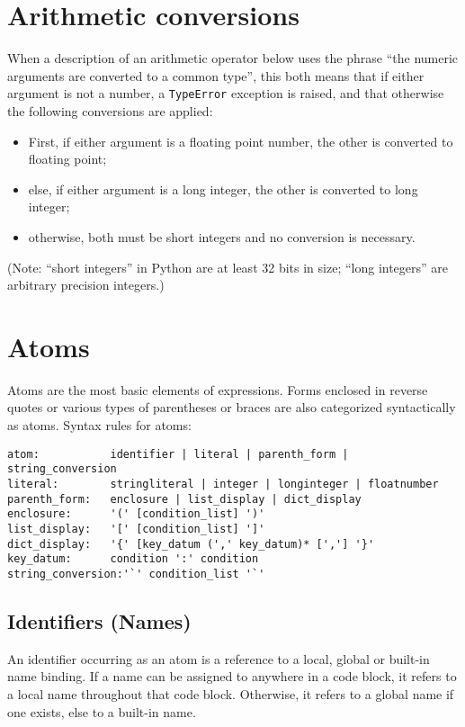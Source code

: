 \section{Arithmetic conversions}

When a description of an arithmetic operator below uses the phrase
``the numeric arguments are converted to a common type'',
this both means that if either argument is not a number, a
{\tt TypeError} exception is raised, and that otherwise
the following conversions are applied:

\begin{itemize}
\item	First, if either argument is a floating point number,
	the other is converted to floating point;
\item	else, if either argument is a long integer,
	the other is converted to long integer;
\item	otherwise, both must be short integers and no conversion
	is necessary.
\end{itemize}

(Note: ``short integers'' in Python are at least 32 bits in size;
``long integers'' are arbitrary precision integers.)

\section{Atoms}

Atoms are the most basic elements of expressions.
Forms enclosed in reverse quotes or various types of parentheses
or braces are also categorized syntactically as atoms.
Syntax rules for atoms:

\begin{verbatim}
atom:           identifier | literal | parenth_form | string_conversion
literal:        stringliteral | integer | longinteger | floatnumber
parenth_form:   enclosure | list_display | dict_display
enclosure:      '(' [condition_list] ')'
list_display:   '[' [condition_list] ']'
dict_display:   '{' [key_datum (',' key_datum)* [','] '}'
key_datum:      condition ':' condition
string_conversion:'`' condition_list '`'
\end{verbatim}

\subsection{Identifiers (Names)}

An identifier occurring as an atom is a reference to a local, global
or built-in name binding.  If a name can be assigned to anywhere in a code
block, it refers to a local name throughout that code block.
Otherwise, it refers to a global name if one exists, else to a
built-in name.


